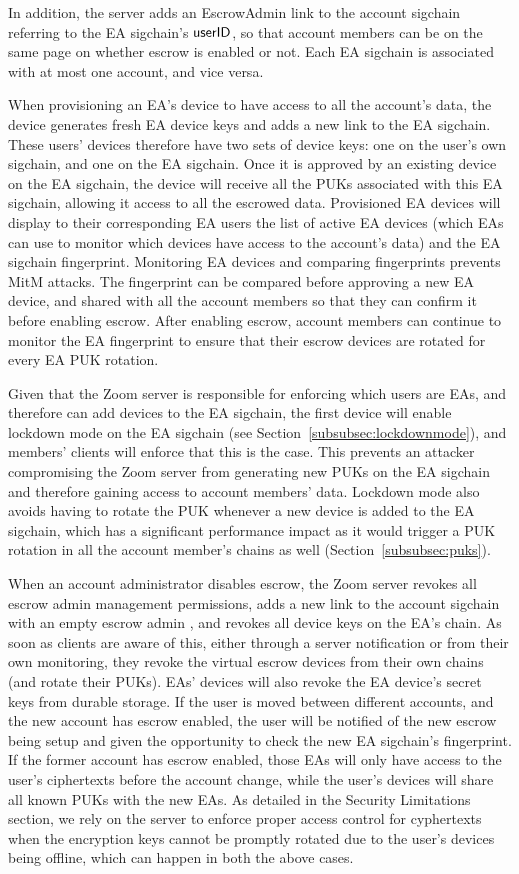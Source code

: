 In addition, the server adds an \textsf{EscrowAdmin} link to the account sigchain referring to the
EA sigchain's $\mathsf{userID}$, so that account members can be on the same page on whether escrow is
enabled or not. Each EA sigchain is associated with at most one account, and vice versa.

When provisioning an EA's device to have access to all the account's data, the device generates
fresh EA device keys and adds a new link to the EA sigchain. These users' devices therefore have two
sets of device keys: one on the user's own sigchain, and one on the EA sigchain. Once it is approved
by an existing device on the EA sigchain, the device will receive all the PUKs associated with this
EA sigchain, allowing it access to all the escrowed data. Provisioned EA devices will display to
their corresponding EA users the list of active EA devices (which EAs can use to monitor which
devices have access to the account's data) and the EA sigchain fingerprint. Monitoring EA devices
and comparing fingerprints prevents MitM attacks. The fingerprint can be compared before approving a
new EA device, and shared with all the account members so that they can confirm it before enabling
escrow. After enabling escrow, account members can continue to monitor the EA fingerprint to ensure
that their escrow devices are rotated for every EA PUK rotation.

Given that the Zoom server is responsible for enforcing which users are EAs, and therefore can add
devices to the EA sigchain, the first device will enable lockdown mode on the EA sigchain (see
Section~\ref{subsubsec:lockdownmode}), and members' clients will enforce that this is the case. This
prevents an attacker compromising the Zoom server from generating new PUKs on the EA sigchain and
therefore gaining access to account members' data. Lockdown mode also avoids having to rotate the
PUK whenever a new device is added to the EA sigchain, which has a significant performance impact as
it would trigger a PUK rotation in all the account member's chains as well
(Section~\ref{subsubsec:puks}).

When an account administrator disables escrow, the Zoom server revokes all escrow admin management
permissions, adds a new link to the account sigchain with an empty escrow admin {\userID}, and
revokes all device keys on the EA's chain. As soon as clients are aware of this, either through a
server notification or from their own monitoring, they revoke the virtual escrow devices from their
own chains (and rotate their PUKs). EAs' devices will also revoke the EA device's secret keys from
durable storage. If the user is moved between different accounts, and the new account has escrow
enabled, the user will be notified of the new escrow being setup and given the opportunity to check
the new EA sigchain's fingerprint. If the former account has escrow enabled, those EAs will only
have access to the user's ciphertexts before the account change, while the user's devices will share
all known PUKs with the new EAs. As detailed in the Security Limitations section, we rely on the
server to enforce proper access control for cyphertexts when the encryption keys cannot be promptly
rotated due to the user's devices being offline, which can happen in both the above cases.

